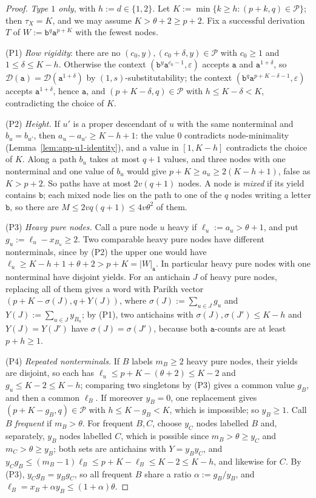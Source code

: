 \documentclass[11pt]{article}
\numberwithin{equation}{section}
\theoremstyle{plain}
\theoremstyle{definition}
\theoremstyle{remark}
\newcommand{\D}{\mathcal{D}}
\newcommand{\eps}{\varepsilon}
\theoremstyle{plain}
\begin{document}
\begin{proof}
\emph{Type $1$ only}, with $h:=d\in\{1,2\}$.  Let $K:=\min\{k\ge h:(p+k,q)\in\mathcal P\}$;
then $\tau_X=K$, and we may assume $K>\theta+2\ge p+2$.  Fix a successful derivation
$T$ of $W:=\mathtt b^q\mathtt a^{p+K}$ with the fewest nodes.

(P1) \emph{Row rigidity}: there are no $(c_0,y),(c_0+\delta,y)\in\mathcal P$ with
$c_0\ge1$ and $1\le\delta\le K-h$.  Otherwise the context
$(\mathtt b^y\mathtt a^{c_0-1},\eps)$ accepts $\mathtt a$ and $\mathtt a^{1+\delta}$, so
$\D(\mathtt a)=\D(\mathtt a^{1+\delta})$ by $(1,s)$-substitutability; the context
$(\mathtt b^q\mathtt a^{p+K-\delta-1},\eps)$ accepts $\mathtt a^{1+\delta}$, hence $\mathtt a$, and
$(p+K-\delta,q)\in\mathcal P$ with $h\le K-\delta<K$, contradicting the choice of $K$.

(P2) \emph{Height.}  If $u'$ is a proper descendant of $u$ with the same nonterminal
and $b_u=b_{u'}$, then $a_u-a_{u'}\ge K-h+1$: the value $0$ contradicts
node-minimality (Lemma~\ref{lem:app-u1-identity}), and a value in $[1,K-h]$
contradicts the choice of $K$.  Along a path $b_u$ takes at most $q+1$ values, and
three nodes with one nonterminal and one value of $b_u$ would give
$p+K\ge a_u\ge2(K-h+1)$, false as $K>p+2$.  So paths have at most $2v(q+1)$ nodes.
A node is \emph{mixed} if its yield contains $\mathtt b$; each mixed node lies on the
path to one of the $q$ nodes writing a letter $\mathtt b$, so there are
$M\le2vq(q+1)\le4v\theta^2$ of them.

(P3) \emph{Heavy pure nodes.}  Call a pure node $u$ heavy if $\ell_u:=a_u>\theta+1$,
and put $g_u:=\ell_u-x_{B_u}\ge2$.  Two comparable heavy pure nodes have different
nonterminals, since by (P2) the upper one would have
$\ell_u\ge K-h+1+\theta+2>p+K=|W|_{\mathtt a}$.  In particular heavy pure nodes with one
nonterminal have disjoint yields.  For an antichain $J$ of heavy pure nodes,
replacing all of them gives a word with Parikh vector
$(p+K-\sigma(J),q+Y(J))$, where $\sigma(J):=\sum_{u\in J}g_u$ and
$Y(J):=\sum_{u\in J}y_{B_u}$; by (P1), two antichains with
$\sigma(J),\sigma(J')\le K-h$ and $Y(J)=Y(J')$ have $\sigma(J)=\sigma(J')$, because
both $\mathtt a$-counts are at least $p+h\ge1$.

(P4) \emph{Repeated nonterminals.}  If $B$ labels $m_B\ge2$ heavy pure nodes, their
yields are disjoint, so each has $\ell_u\le p+K-(\theta+2)\le K-2$ and
$g_u\le K-2\le K-h$; comparing two singletons by (P3) gives a common value $g_B$, and
then a common $\ell_B$.  If moreover $y_B=0$, one replacement gives
$(p+K-g_B,q)\in\mathcal P$ with $h\le K-g_B<K$, which is impossible; so $y_B\ge1$.
Call $B$ \emph{frequent} if $m_B>\theta$.  For frequent $B,C$, choose $y_C$
nodes labelled $B$ and, separately, $y_B$ nodes labelled $C$, which is possible
since $m_B>\theta\ge y_C$ and $m_C>\theta\ge y_B$; both sets are antichains with
$Y=y_By_C$, and
$y_Cg_B\le(m_B-1)\ell_B\le p+K-\ell_B\le K-2\le K-h$, and likewise for $C$.  By (P3),
$y_Cg_B=y_Bg_C$, so all frequent $B$ share a ratio $\alpha:=g_B/y_B$, and
$\ell_B=x_B+\alpha y_B\le(1+\alpha)\theta$.


\end{proof}
\end{document}
